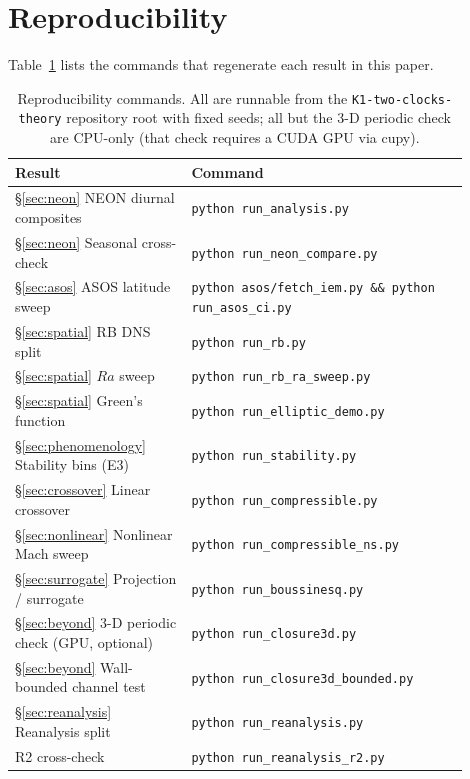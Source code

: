 \documentclass[11pt]{article}
\begin{document}
\appendix

\section{Reproducibility}
\label{app:reproducibility}

Table~\ref{tab:commands} lists the commands that regenerate each result in this paper.

\begin{table}[h]
\centering
\caption{Reproducibility commands. All are runnable from the \texttt{K1-two-clocks-theory} repository root with fixed seeds; all but the 3-D periodic check are CPU-only (that check requires a CUDA GPU via cupy).}
\label{tab:commands}
\small
\begin{tabular}{p{0.35\linewidth}p{0.55\linewidth}}
\toprule
Result & Command \\
\midrule
\S\ref{sec:neon} NEON diurnal composites &
\texttt{python run\_analysis.py} \\
\S\ref{sec:neon} Seasonal cross-check &
\texttt{python run\_neon\_compare.py} \\
\S\ref{sec:asos} ASOS latitude sweep &
\texttt{python asos/\allowbreak fetch\_iem.py \&\&
python run\_asos\_ci.py} \\
\S\ref{sec:spatial} RB DNS split &
\texttt{python run\_rb.py} \\
\S\ref{sec:spatial} $Ra$ sweep &
\texttt{python run\_rb\_ra\_sweep.py} \\
\S\ref{sec:spatial} Green's function &
\texttt{python run\_elliptic\_demo.py} \\
\S\ref{sec:phenomenology} Stability bins (E3) &
\texttt{python run\_stability.py} \\
\S\ref{sec:crossover} Linear crossover &
\texttt{python run\_compressible.py} \\
\S\ref{sec:nonlinear} Nonlinear Mach sweep &
\texttt{python run\_compressible\_ns.py} \\
\S\ref{sec:surrogate} Projection / surrogate &
\texttt{python run\_boussinesq.py} \\
\S\ref{sec:beyond} 3-D periodic check (GPU, optional) &
\texttt{python run\_closure3d.py} \\
\S\ref{sec:beyond} Wall-bounded channel test &
\texttt{python run\_closure3d\_bounded.py} \\
\S\ref{sec:reanalysis} Reanalysis split &
\texttt{python run\_reanalysis.py} \\
R2 cross-check &
\texttt{python run\_reanalysis\_r2.py} \\
\bottomrule
\end{tabular}
\end{table}
\end{document}
